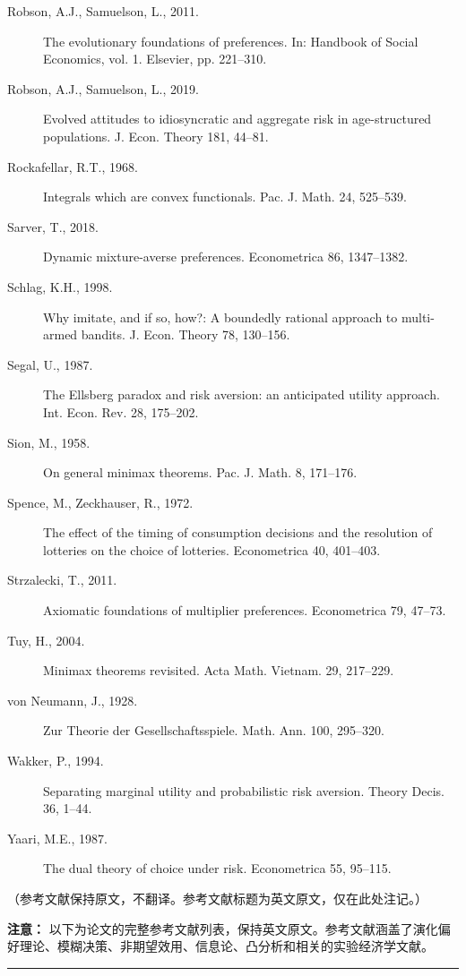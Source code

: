 \documentclass[12pt,a4paper]{article}
\newenvironment{original}
  {\par\noindent\color{black}\smallskip}
  {\par\smallskip}
\newenvironment{translation}
  {\par\noindent\color{blue!70!black}\smallskip}
  {\par\medskip\hrule\medskip}
\begin{document}
\begin{original}
\begin{description}
\item[Robson, A.J., Samuelson, L., 2011.] The evolutionary foundations of preferences. In: Handbook of Social Economics, vol. 1. Elsevier, pp. 221--310.

\item[Robson, A.J., Samuelson, L., 2019.] Evolved attitudes to idiosyncratic and aggregate risk in age-structured populations. J. Econ. Theory 181, 44--81.

\item[Rockafellar, R.T., 1968.] Integrals which are convex functionals. Pac. J. Math. 24, 525--539.

\item[Sarver, T., 2018.] Dynamic mixture-averse preferences. Econometrica 86, 1347--1382.

\item[Schlag, K.H., 1998.] Why imitate, and if so, how?: A boundedly rational approach to multi-armed bandits. J. Econ. Theory 78, 130--156.

\item[Segal, U., 1987.] The Ellsberg paradox and risk aversion: an anticipated utility approach. Int. Econ. Rev. 28, 175--202.

\item[Sion, M., 1958.] On general minimax theorems. Pac. J. Math. 8, 171--176.

\item[Spence, M., Zeckhauser, R., 1972.] The effect of the timing of consumption decisions and the resolution of lotteries on the choice of lotteries. Econometrica 40, 401--403.

\item[Strzalecki, T., 2011.] Axiomatic foundations of multiplier preferences. Econometrica 79, 47--73.

\item[Tuy, H., 2004.] Minimax theorems revisited. Acta Math. Vietnam. 29, 217--229.

\item[von Neumann, J., 1928.] Zur Theorie der Gesellschaftsspiele. Math. Ann. 100, 295--320.

\item[Wakker, P., 1994.] Separating marginal utility and probabilistic risk aversion. Theory Decis. 36, 1--44.

\item[Yaari, M.E., 1987.] The dual theory of choice under risk. Econometrica 55, 95--115.
\end{description}
\end{original}
\begin{translation}
（参考文献保持原文，不翻译。参考文献标题为英文原文，仅在此处注记。）

\textbf{注意：} 以下为论文的完整参考文献列表，保持英文原文。参考文献涵盖了演化偏好理论、模糊决策、非期望效用、信息论、凸分析和相关的实验经济学文献。
\end{translation}
\end{document}
